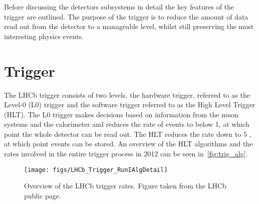 Before discussing the detectors subsystems in detail the key features of the trigger are outlined. The purpose of the trigger is to reduce the amount of data read out from the detector to a manageable level, whilst still preserving the most interesting physics events.
\section{Trigger}
\label{sec:trig}
The LHCb trigger consists of two levels, the hardware trigger, referred to as the Level-0 (\Gls{L0}) trigger and the software trigger referred to as the High Level Trigger (\Gls{HLT}). The L0 trigger makes decisions based on information from the muon systems and the calorimeter and reduces the rate of events to below 1\mhz, at which point the whole detector can be read out. The HLT reduces the rate down to 5 \khz, at which point events can be stored. %
An overview of the HLT algorithms and the rates involved in the entire trigger process in 2012 can be seen in~\autoref{fig:trig_alg}.


\begin{figure}[!h]
  \centering
    \texttt{[image: figs/LHCb\_Trigger\_RunIAlgDetail]} 
  \caption{Overview of the LHCb trigger rates. Figure taken from the LHCb public page.}%
  
  \label{fig:trig_alg}
\end{figure}



